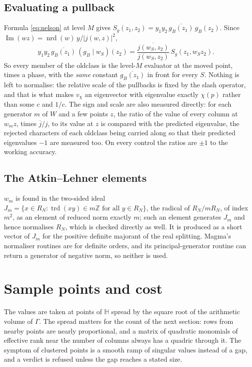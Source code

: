 \documentclass[11pt,reqno]{amsart}
\theoremstyle{plain}
\theoremstyle{definition}
\DeclareMathOperator{\nrd}{nrd}
\DeclareMathOperator{\trd}{trd}
\newcommand{\Z}{\mathbb{Z}}
\newcommand{\HH}{\mathbb{H}}
\begin{document}
\subsection*{Evaluating a pullback}
Formula \eqref{eq:nelson} at level $M$ gives $S_g(z_1,z_2)=y_1y_2\,\overline{g_B(z_1)}\,g_B(z_2)$.
Since $\operatorname{Im}(wz)=\nrd(w)\,y/\lvert j(w,z)\rvert^2$,
\begin{equation}\label{eq:pullback}
y_1y_2\,\overline{g_B(z_1)}\,(g_B\mid w_S)(z_2)=\frac{\overline{j(w_S,z_2)}}{j(w_S,z_2)}\,
S_g(z_1,w_Sz_2).
\end{equation}
So every member of the oldclass is the level-$M$ evaluator at the moved point, times a phase,
with the \emph{same} constant $\overline{g_B(z_1)}$ in front for every $S$. Nothing is left to
normalise: the relative scale of the pullbacks is fixed by the slash operator, and that is what
makes $v_\chi$ an eigenvector with eigenvalue exactly $\chi(p)$ rather than some $c$ and $1/c$.
The sign and scale are also measured directly: for each generator $m$ of $W$ and a few points
$z$, the ratio of the value of every column at $w_mz$, times $\overline{j}/j$, to its value at
$z$ is compared with the predicted eigenvalue, the rejected characters of each oldclass being
carried along so that their predicted eigenvalues $-1$ are measured too. On every control the
ratios are $\pm1$ to the working accuracy.

\subsection*{The Atkin--Lehner elements}
$w_m$ is found in the two-sided ideal $J_m=\{x\in R_N:\trd(xy)\in m\Z\text{ for all }y\in R_N\}$,
the radical of $R_N/mR_N$, of index $m^2$, as an element of reduced norm exactly $m$; such an
element generates $J_m$ and hence normalises $R_N$, which is checked directly as well. It is
produced as a short vector of $J_m$ for the positive definite majorant of the real splitting.
Magma's normaliser routines are for definite orders, and its principal-generator routine can
return a generator of negative norm, so neither is used.

\section{Sample points and cost}

The values are taken at points of $\HH$ spread by the square root of the arithmetic volume of
$\Gamma$. The spread matters for the count of the next section: rows from nearby points are
nearly proportional, and a matrix of quadratic monomials of effective rank near the number of
columns always has a quadric through it. The symptom of clustered points is a smooth ramp of
singular values instead of a gap, and a verdict is refused unless the gap reaches a stated size.
\end{document}
